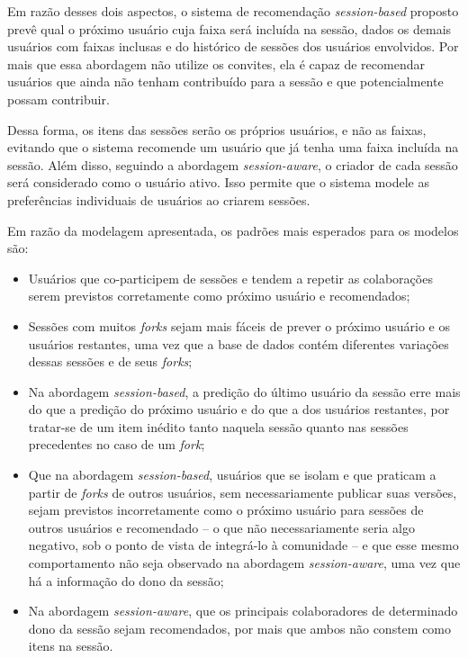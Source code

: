 Em razão desses dois aspectos, o sistema de recomendação \textit{session-based}
proposto prevê qual o próximo usuário cuja faixa será incluída na sessão, dados
os demais usuários com faixas inclusas e do histórico de sessões dos usuários
envolvidos. Por mais que essa abordagem não utilize os convites, ela é capaz de
recomendar usuários que ainda não tenham contribuído para a sessão e que
potencialmente possam contribuir.

Dessa forma, os itens das sessões serão os próprios usuários, e não as faixas,
evitando que o sistema recomende um usuário que já tenha uma faixa incluída na
sessão. Além disso, seguindo a abordagem \textit{session-aware}, o criador de
cada sessão será considerado como o usuário ativo. Isso permite que o sistema
modele as preferências individuais de usuários ao criarem sessões.

Em razão da modelagem apresentada, os padrões mais esperados para os modelos são:

\begin{itemize}
  \item Usuários que co-participem de sessões e tendem a repetir as
  colaborações serem previstos corretamente como próximo usuário e recomendados;
  \item Sessões com muitos \textit{forks} sejam mais fáceis de prever o próximo
  usuário e os usuários restantes, uma vez que a base de dados contém diferentes
  variações dessas sessões e de seus \textit{forks};
  \item Na abordagem \textit{session-based}, a predição do último usuário da
sessão erre mais do que a predição do próximo usuário e do que a dos
usuários restantes, por tratar-se de um item inédito tanto naquela sessão quanto
nas sessões precedentes no caso de um \textit{fork};
  \item Que na abordagem \textit{session-based}, usuários que se isolam e que
 praticam a partir de \textit{forks} de outros usuários, sem necessariamente
 publicar suas versões, sejam previstos incorretamente como o próximo usuário
 para sessões de outros usuários e recomendado -- o que não necessariamente
 seria algo negativo, sob o ponto de vista de integrá-lo à comunidade -- e que esse
 mesmo comportamento não seja observado na abordagem \textit{session-aware}, uma vez que 
 há a informação do dono da sessão;
  \item Na abordagem \textit{session-aware}, que os principais colaboradores de
  determinado dono da sessão sejam recomendados, por mais que ambos não constem como
  itens na sessão.
\end{itemize}

